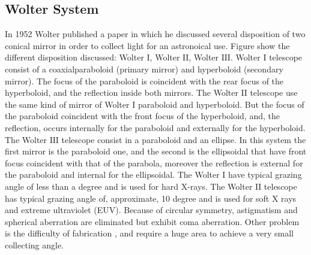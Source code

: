 \subsection{Wolter System \cite{X-RayWolter}} 
\hspace{10mm} In 1952 Wolter published a paper in which he discussed several disposition of two conical mirror in order to collect light for an astronoical use. Figure show the different disposition discussed: Wolter $\mathrm{I} $, Wolter $\mathrm{II} $, Wolter $\mathrm{III} $.
\noindent Wolter $\mathrm{I} $ telescope consist of a coaxialparaboloid (primary mirror) and hyperboloid (secondary mirror). The focus of the paraboloid is coincident with the rear focus of the hyperboloid, and the reflection inside both mirrors. The Wolter $\mathrm{II} $ telescope use the same kind of mirror of Wolter $\mathrm{I} $ paraboloid and hyperboloid. But the focus of the paraboloid coincident with the front focus of the hyperboloid, and, the reflection, occurs internally for the paraboloid and externally for the hyperboloid. The Wolter $\mathrm{III} $ telescope consist in a paraboloid and an ellipse. In this system the first mirror is the paraboloid one, and the second is the ellipsoidal that have front focus coincident with that of the parabola, moreover the reflection is external for the paraboloid and internal for the ellipsoidal.
\noindent The Wolter $\mathrm{I} $ have typical grazing angle of less than a degree and is used for hard X-rays. The Wolter $\mathrm{II} $ telescope has typical grazing angle of, approximate, 10 degree and is used for soft X rays and extreme ultraviolet (EUV).
\noindent Because of circular symmetry, astigmatism and spherical aberration are eliminated but  exhibit coma aberration. Other problem is the difficulty of fabrication , and require a huge area to achieve a very small collecting angle.
